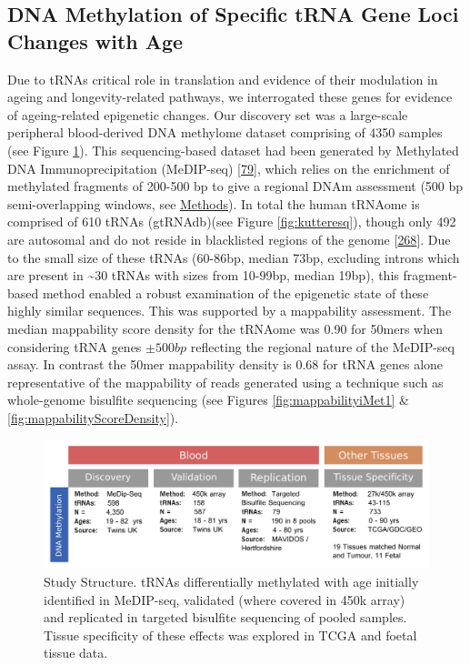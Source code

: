 \documentclass[
]{book}
\begin{document}
\hypertarget{dna-methylation-of-specific-trna-gene-loci-changes-with-age}{%
\subsection{DNA Methylation of Specific tRNA Gene Loci Changes with Age}\label{dna-methylation-of-specific-trna-gene-loci-changes-with-age}}

Due to tRNAs critical role in translation and evidence of their modulation in ageing and longevity-related pathways, we interrogated these genes for evidence of ageing-related epigenetic changes.
Our discovery set was a large-scale peripheral blood-derived DNA methylome dataset comprising of 4350 samples (see Figure \ref{fig:OverviewOfAnalyses}).
This sequencing-based dataset had been generated by Methylated DNA Immunoprecipitation (MeDIP-seq) {[}\protect\hyperlink{ref-Down2009}{79}{]}, which relies on the enrichment of methylated fragments of 200-500 bp to give a regional DNAm assessment (500 bp semi-overlapping windows, see \protect\hyperlink{EpiTwinsMethods}{Methods}).
In total the human tRNAome is comprised of 610 tRNAs (gtRNAdb)(see Figure \ref{fig:kutteresq}), though only 492 are autosomal and do not reside in blacklisted regions of the genome {[}\protect\hyperlink{ref-Amemiya2019}{268}{]}.
Due to the small size of these tRNAs (60-86bp, median 73bp, excluding introns which are present in \textasciitilde30 tRNAs with sizes from 10-99bp, median 19bp), this fragment-based method enabled a robust examination of the epigenetic state of these highly similar sequences.
This was supported by a mappability assessment.
The median mappability score density for the tRNAome was 0.90 for 50mers when considering tRNA genes \(\pm500bp\) reflecting the regional nature of the MeDIP-seq assay.
In contrast the 50mer mappability density is 0.68 for tRNA genes alone representative of the mappability of reads generated using a technique such as whole-genome bisulfite sequencing (see Figures \ref{fig:mappabilityiMet1} \& \ref{fig:mappabilityScoreDensity}).

\begin{figure}

{\centering \includegraphics[width=1\linewidth]{figs/OverviewOfAnalysesFigure_tRNA_3} 

}

\caption{Study Structure. tRNAs differentially methylated with age initially identified in MeDIP-seq, validated (where covered in 450k array) and replicated in targeted bisulfite sequencing of pooled samples. Tissue specificity of these effects was explored in TCGA and foetal tissue data.}\label{fig:OverviewOfAnalyses}
\end{figure}
\end{document}
